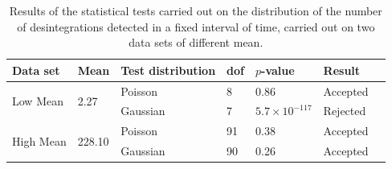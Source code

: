 \begin{table}[htbp]
    \centering
    \begin{tabular}{lllllll}
        \hline
        Data set & Mean & Test distribution & dof & $p$-value & Result \\
        \hline
        \multirow{2}{*}{Low Mean} & \multirow{2}{*}{2.27} & Poisson & 8 & 0.86 & Accepted\\
        & & Gaussian & 7 & $5.7 \times 10^{-117}$ & Rejected \\
        \multirow{2}{*}{High Mean} & \multirow{2}{*}{228.10} & Poisson & 91 & 0.38 & Accepted\\
        & & Gaussian & 90 & 0.26 & Accepted\\
        \hline
    \end{tabular}
    \caption{Results of the statistical tests carried out on 
    the distribution of the number of desintegrations detected 
    in a fixed interval of time, carried out on two data sets 
    of different mean.}
    \label{tab:statistical_tests}
\end{table}

